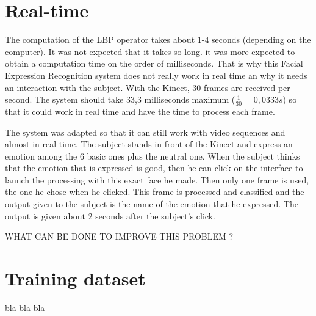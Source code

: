 \section{Real-time}

\vspace{\baselineskip}
\noindent The computation of the LBP operator takes about 1-4 seconds (depending on the computer). It was not expected that it takes so long. it was more expected to obtain a computation time on the order of milliseconds. That is why this Facial Expression Recognition system does not really work in real time an why it needs an interaction with the subject. With the Kinect, 30 frames are received per second. The system should take 33,3 milliseconds maximum ($ \frac{1}{30} = 0,0333 s $) so that it could work in real time and have the time to process each frame. 
\newline

\noindent The system was adapted so that it can still work with video sequences and almost in real time. The subject stands in front of the Kinect and express an emotion among the 6 basic ones plus the neutral one. When the subject thinks that the emotion that is expressed is good, then he can click on the interface to launch the processing with this exact face he made. Then only one frame is used, the one he chose when he clicked. This frame is processed and classified and the output given to the subject is the name of the emotion that he expressed. The output is given about 2 seconds after the subject's click.
\newline

\noindent WHAT CAN BE DONE TO IMPROVE THIS PROBLEM ?
\newline

\section{Training dataset}

\vspace{\baselineskip}

\noindent bla bla bla
\newline